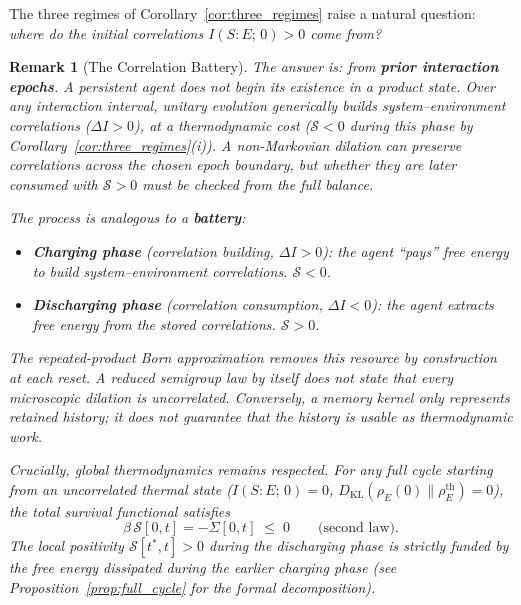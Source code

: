 \documentclass[12pt]{article}
\newtheorem{remark}[theorem]{Remark}
\begin{document}
The three regimes of Corollary~\ref{cor:three_regimes} raise a
natural question: \emph{where do the initial correlations
$I(S{:}E;\, 0) > 0$ come from?}

\begin{remark}[The Correlation Battery]
\label{rem:battery}
The answer is: from \textbf{prior interaction epochs}.
A persistent agent does not begin its existence in a product
state.
Over any interaction interval, unitary evolution generically
builds system--environment correlations ($\Delta I > 0$),
at a thermodynamic cost ($\mathcal{S} < 0$ during this
phase by Corollary~\ref{cor:three_regimes}(i)).
A non-Markovian dilation can preserve correlations across the chosen
epoch boundary, but whether they are later consumed with
$\mathcal S>0$ must be checked from the full balance.

The process is analogous to a \textbf{battery}:
\begin{itemize}
\item \textbf{Charging phase}
  (correlation building, $\Delta I > 0$):
  the agent ``pays'' free energy to build
  system--environment correlations.
  $\mathcal{S} < 0$.
\item \textbf{Discharging phase}
  (correlation consumption, $\Delta I < 0$):
  the agent extracts free energy from the stored
  correlations.
  $\mathcal{S} > 0$.
\end{itemize}
The repeated-product Born approximation removes this resource by
construction at each reset.  A reduced semigroup law by itself does not
state that every microscopic dilation is uncorrelated.  Conversely, a
memory kernel only represents retained history; it does not guarantee
that the history is usable as thermodynamic work.

Crucially, global thermodynamics remains respected.
For any full cycle starting from an uncorrelated thermal
state ($I(S{:}E;\,0) = 0$,
$D_{\mathrm{KL}}(\rho_E(0)\|\rho_E^{\mathrm{th}}) = 0$),
the total survival functional satisfies
\begin{equation}
\label{eq:battery_closure}
\beta\,\mathcal{S}[0, t]
= -\Sigma[0, t] \;\leq\; 0
\qquad\text{(second law).}
\end{equation}
The local positivity $\mathcal{S}[t^*, t] > 0$ during the
discharging phase is strictly funded by the free energy
dissipated during the earlier charging phase
(see Proposition~\ref{prop:full_cycle} for the formal
decomposition).
\end{remark}
\end{document}
